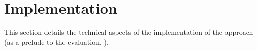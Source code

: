 \section{Implementation}
\label{sec:implementation}

This section details the technical aspects of the implementation of the approach (as a prelude to
the evaluation, ).
